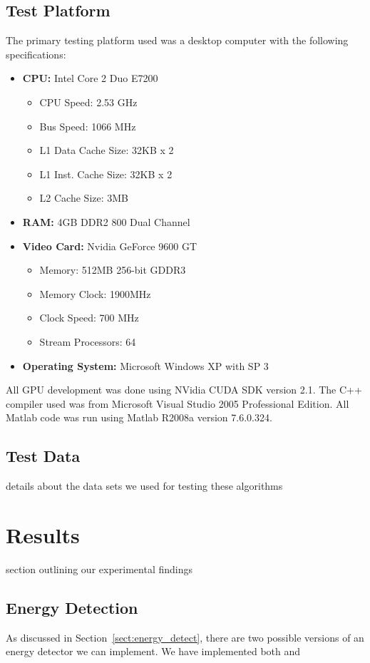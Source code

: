 \subsection{Test Platform}
\label{sect:test_platform}
The primary testing platform used was a desktop computer with the following specifications:
\begin{itemize}
\item \textbf{CPU:} Intel Core 2 Duo E7200
	\begin{itemize}
	\item CPU Speed: 2.53 GHz
	\item Bus Speed: 1066 MHz
	\item L1 Data Cache Size: 32KB x 2
	\item L1 Inst. Cache Size: 32KB x 2
	\item L2 Cache Size: 3MB
	\end{itemize}
\item \textbf{RAM:} 4GB DDR2 800 Dual Channel
\item \textbf{Video Card:} Nvidia GeForce 9600 GT
	\begin{itemize}
	\item Memory: 512MB 256-bit GDDR3
	\item Memory Clock: 1900MHz
	\item Clock Speed: 700 MHz
	\item Stream Processors: 64
	\end{itemize}
\item \textbf{Operating System:} Microsoft Windows XP with SP 3
\end{itemize}

All GPU development was done using NVidia CUDA SDK version 2.1.  The C++ compiler used was from Microsoft Visual Studio 2005 Professional Edition.  All Matlab code was run using Matlab R2008a version 7.6.0.324.

\subsection{Test Data}
details about the data sets we used for testing these algorithms



\section{Results}
section outlining our experimental findings

\subsection{Energy Detection}
\label{sect:energy_detect_result}
As discussed in Section~\ref{sect:energy_detect}, there are two possible versions of an energy detector we can implement.  We have implemented both and 

